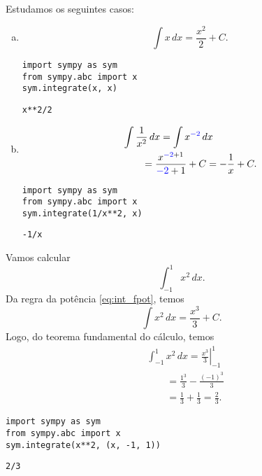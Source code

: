 \begin{ex}
  Estudamos os seguintes casos:
  \begin{enumerate}[a)]
  \item
    \begin{equation}
      \int x\,dx = \frac{x^2}{2} + C.
    \end{equation}

\begin{lstlisting}
import sympy as sym
from sympy.abc import x
sym.integrate(x, x)
\end{lstlisting}

\begin{verbatim}
x**2/2
\end{verbatim}

  \item
    \begin{align}
      & \int \frac{1}{x^2}\,dx = \int x^{\color{blue}-2}\,dx \\
      &\text{}\qquad = \frac{x^{{\color{blue}-2}+1}}{{\color{blue}-2}+1} + C = -\frac{1}{x}+C.
    \end{align}

\begin{lstlisting}
import sympy as sym
from sympy.abc import x
sym.integrate(1/x**2, x)
\end{lstlisting}

\begin{verbatim}
-1/x
\end{verbatim}

  \end{enumerate}
\end{ex}

\begin{ex}
  Vamos calcular
  \begin{equation}
    \int_{-1}^1 x^2\,dx.
  \end{equation}
  Da regra da potência \eqref{eq:int_fpot}, temos
  \begin{equation}
    \int x^2\,dx = \frac{x^3}{3} + C.
  \end{equation}
  Logo, do teorema fundamental do cálculo, temos
  \begin{align}
    & \int_{-1}^1 x^2\,dx = \left.\frac{x^3}{3}\right|_{-1}^1 \\
    &\text{}\qquad = \frac{1^3}{3} - \frac{(-1)^3}{3} \\
    &\text{}\qquad = \frac{1}{3} + \frac{1}{3} = \frac{2}{3}.
  \end{align}

\begin{lstlisting}
import sympy as sym
from sympy.abc import x
sym.integrate(x**2, (x, -1, 1))
\end{lstlisting}

\begin{verbatim}
2/3
\end{verbatim}

\end{ex}

